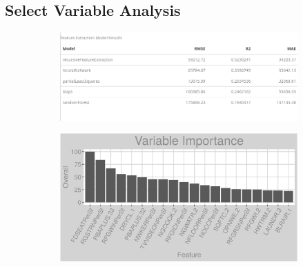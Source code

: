\subsection{Select Variable Analysis}
\label{appendix:natural_gas:sva}
\begin{figure}[h]
\centering
\begin{subfigure}{0.8\textwidth}
\centering
\includegraphics[width=.99\textwidth, height=0.35\textheight]{Images/natural_gas_psf_fe_summary.png}
\end{subfigure}
\begin{subfigure}{1\textwidth}
\centering
\includegraphics[width=.99\textwidth, height=0.35\textheight]{Images/natural_gas_psf_all_vars.png}
\end{subfigure}
\end{figure}
\FloatBarrier
\newpage
